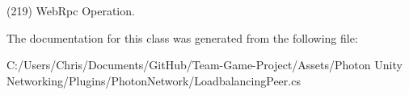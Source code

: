 (219) Web\+Rpc Operation.



The documentation for this class was generated from the following file\+:\begin{DoxyCompactItemize}
\item 
C\+:/\+Users/\+Chris/\+Documents/\+Git\+Hub/\+Team-\/\+Game-\/\+Project/\+Assets/\+Photon Unity Networking/\+Plugins/\+Photon\+Network/Loadbalancing\+Peer.\+cs\end{DoxyCompactItemize}
